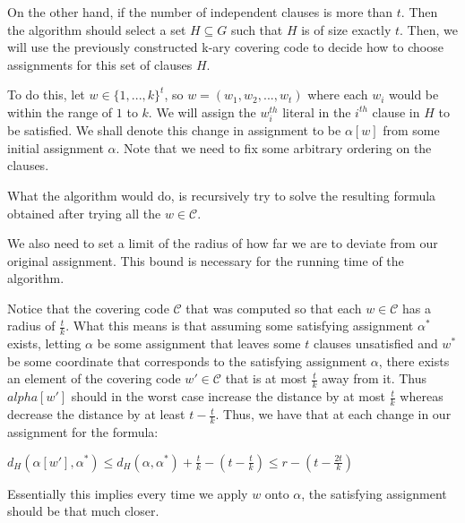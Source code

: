 \documentclass[a4paper,12pts]{article}
\begin{document}
On the other hand, if the number of independent clauses is more than $t$. Then the algorithm should select a set $H \subseteq G$ such that $H$ is of size exactly $t$. Then, we will use the previously constructed k-ary covering code to decide how to choose assignments for this set of clauses $H$.\par

To do this, let $w \in \{1, ..., k\}^t$, so $w = (w_1, w_2, ..., w_t)$ where each $w_i$ would be within the range of $1$ to $k$. We will assign the $w_i^{th}$ literal in the $i^{th}$ clause in $H$ to be satisfied. We shall denote this change in assignment to be $\alpha[w]$ from some initial assignment $\alpha$. Note that we need to fix some arbitrary ordering on the clauses. \par

What the algorithm would do, is recursively try to solve the resulting formula obtained after trying all the $w \in \mathcal{C}$. 

We also need to set a limit of the radius of how far we are to deviate from our original assignment. This bound is necessary for the running time of the algorithm.\par

Notice that the covering code $\mathcal{C}$ that was computed so that each $w \in \mathcal{C}$ has a radius of $\frac{t}{k}$. What this means is that assuming some satisfying assignment $\alpha^*$ exists, letting $\alpha$ be some assignment that leaves some $t$ clauses unsatisfied and $w^*$ be some coordinate that corresponds to the satisfying assignment $\alpha$, there exists an element of the covering code $w' \in \mathcal{C}$ that is at most $\frac{t}{k}$ away from it. Thus $
alpha[w']$ should in the worst case increase the distance by at most $\frac{t}{k}$ whereas decrease the distance by at least $t - \frac{t}{k}$. Thus, we have that at each change in our assignment for the formula: \par

\begin{center}
	$d_H(\alpha[w'], \alpha^{*}) \leq d_H(\alpha, \alpha^{*}) + \frac{t}{k} - (t - \frac{t}{k}) \leq r - (t - \frac{2t}{k})$
\end{center}

Essentially this implies every time we apply $w$ onto $\alpha$, the satisfying assignment should be that much closer.\par
\end{document}
